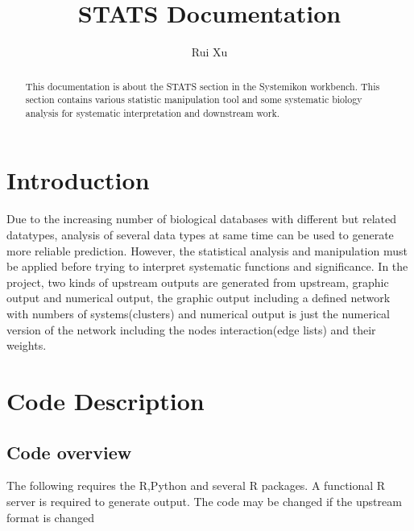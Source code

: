 \documentclass[doublespaced, 12pt]{article}
\title{STATS Documentation}
\author{Rui Xu}
\begin{document}
\maketitle

\begin{abstract}
This documentation is about the STATS section in the Systemikon workbench. This section contains various statistic manipulation tool and some systematic biology analysis for systematic interpretation and downstream work. 
\end{abstract}

\section{Introduction}
Due to the increasing number of biological databases with different but related datatypes, analysis of several data types at same time can be used to generate more reliable prediction. However, the statistical analysis and manipulation must be applied before trying to interpret systematic functions and significance. In the project, two kinds of upstream outputs are generated from upstream, graphic output and numerical output, the graphic output including a defined network with numbers of systems(clusters) and numerical output is just the numerical version of the network including the nodes interaction(edge lists) and their weights. 

\section{Code Description}
\subsection{Code overview}
The following requires the R,Python and several R packages. A functional R server is required to generate output. The code may be changed if the upstream format is changed
\end{document}
